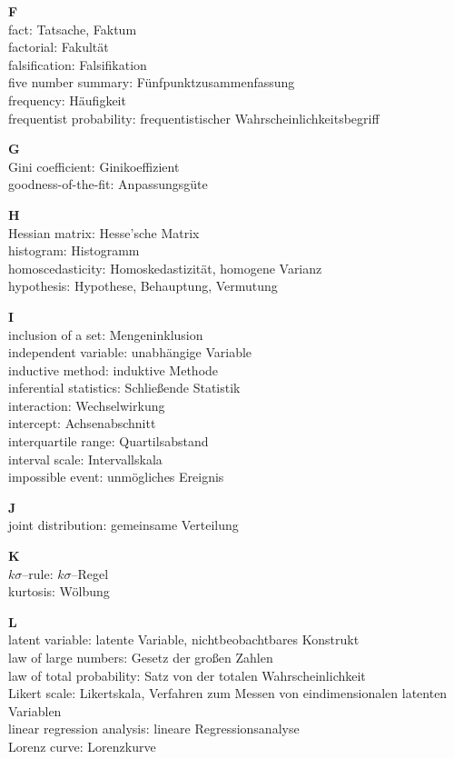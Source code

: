 \medskip
\noindent
{\bf F}\\
fact: Tatsache, Faktum\\
factorial: Fakult\"{a}t\\
falsification: Falsifikation\\
five number summary: F\"{u}nfpunktzusammenfassung\\
frequency: H\"{a}ufigkeit\\
frequentist probability: frequentistischer 
Wahrscheinlichkeitsbegriff

\medskip
\noindent
{\bf G}\\
Gini coefficient: Ginikoeffizient\\
goodness-of-the-fit: Anpassungsg\"{u}te

\medskip
\noindent
{\bf H}\\
Hessian matrix: Hesse'sche Matrix\\
histogram: Histogramm\\
homoscedasticity: Homoskedastizit\"{a}t, homogene Varianz\\
hypothesis: Hypothese, Behauptung, Vermutung

\medskip
\noindent
{\bf I}\\
inclusion of a set: Mengeninklusion\\
independent variable: unabh\"{a}ngige Variable\\
inductive method: induktive Methode\\
inferential statistics: Schlie\ss ende Statistik\\
interaction: Wechselwirkung\\
intercept: Achsenabschnitt\\
interquartile range: Quartilsabstand\\
interval scale: Intervallskala\\
impossible event: unm\"{o}gliches Ereignis

\medskip
\noindent
{\bf J}\\
joint distribution: gemeinsame Verteilung

\medskip
\noindent
{\bf K}\\
$k\sigma$--rule: $k\sigma$--Regel\\
kurtosis: W\"{o}lbung

\medskip
\noindent
{\bf L}\\
latent variable: latente Variable, nichtbeobachtbares Konstrukt\\
law of large numbers: Gesetz der gro\ss en Zahlen\\
law of total probability: Satz von der totalen Wahrscheinlichkeit\\
Likert scale: Likertskala, Verfahren zum Messen von 
eindimensionalen latenten Variablen\\
linear regression analysis: lineare Regressionsanalyse\\
Lorenz curve: Lorenzkurve

